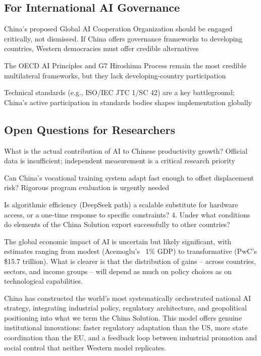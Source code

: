 \documentclass[11pt,a4paper]{article}
\begin{document}
\subsection{For International AI Governance}

\item China's proposed Global AI Cooperation Organization should be engaged critically, not dismissed. If China offers governance frameworks to developing countries, Western democracies must offer credible alternatives
\item The OECD AI Principles and G7 Hiroshima Process remain the most credible multilateral frameworks, but they lack developing-country participation
\item Technical standards (e.g., ISO/IEC JTC 1/SC 42) are a key battleground; China's active participation in standards bodies shapes implementation globally

\subsection{Open Questions for Researchers}

\item What is the actual contribution of AI to Chinese productivity growth? Official data is insufficient; independent measurement is a critical research priority
\item Can China's vocational training system adapt fast enough to offset displacement risk? Rigorous program evaluation is urgently needed
\item Is algorithmic efficiency (DeepSeek path) a scalable substitute for hardware access, or a one-time response to specific constraints?
4. Under what conditions do elements of the China Solution export successfully to other countries?



The global economic impact of AI is uncertain but likely significant, with estimates ranging from modest (Acemoglu's ~1\% GDP) to transformative (PwC's \$15.7 trillion). What is clearer is that the distribution of gains -- across countries, sectors, and income groups -- will depend as much on policy choices as on technological capabilities.

China has constructed the world's most systematically orchestrated national AI strategy, integrating industrial policy, regulatory architecture, and geopolitical positioning into what we term the China Solution. This model offers genuine institutional innovations: faster regulatory adaptation than the US, more state coordination than the EU, and a feedback loop between industrial promotion and social control that neither Western model replicates.
\end{document}
